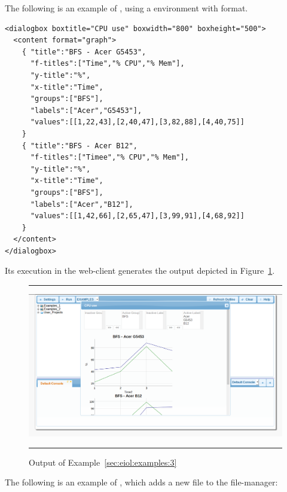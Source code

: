 \begin{example}
\label{sec:eiol:examples:3}

The following is an example of ,
using a  environment with 
format.

\medskip
\begin{lstlisting}
<dialogbox boxtitle="CPU use" boxwidth="800" boxheight="500">
  <content format="graph">
    { "title":"BFS - Acer G5453",
      "f-titles":["Time","% CPU","% Mem"],
      "y-title":"%",
      "x-title":"Time",
      "groups":["BFS"],
      "labels":["Acer","G5453"],
      "values":[[1,22,43],[2,40,47],[3,82,88],[4,40,75]]
    }
    { "title":"BFS - Acer B12",
      "f-titles":["Timee","% CPU","% Mem"],
      "y-title":"%",
      "x-title":"Time",
      "groups":["BFS"],
      "labels":["Acer","B12"],
      "values":[[1,42,66],[2,65,47],[3,99,91],[4,68,92]]
    }
  </content>
</dialogbox>
\end{lstlisting}

\medskip
\noindent
Its execution in the web-client generates the output depicted in
Figure~\ref{fig:examples:3}.

\begin{figure}[h]
\hrule\smallskip
\begin{center}
\includegraphics[width=1\textwidth]{fig/example3.png}
\end{center}
\caption{Output of Example~\ref{sec:eiol:examples:3}}
\label{fig:examples:3}
\hrule
\end{figure}

\begin{example}
\label{sec:eiol:examples:4}
%
The following is an example of ,
which adds a new file to the file-manager:


\end{example}
\end{example}
